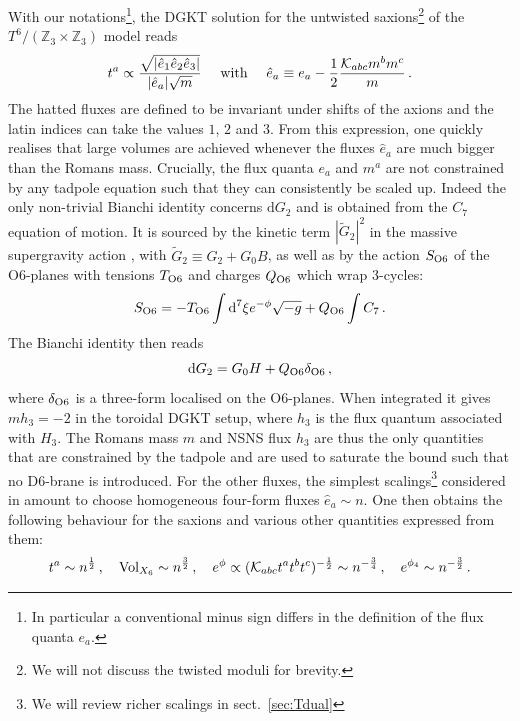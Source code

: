 \documentclass[11pt, a4paper]{article}
\newcommand{\K}{{\cal K}}
\newcommand{\dd}{\text{d}}
\newcommand{\Z}{\mathbb{Z}}
\newcommand{\half}{\frac{1}{2}}
\begin{document}
With our notations\footnote{In particular a conventional minus sign differs in the definition of the flux quanta $e_a$.}, the DGKT solution for the untwisted saxions\footnote{We will not discuss the twisted moduli for brevity.} of the $T^6/(\Z_3\times\Z_3)$ model reads
\begin{equation}
\label{eq:DGKT}
t^a\propto\frac{\sqrt{|\hat e_1\hat e_2\hat e_3|}}{|\hat e_a|\sqrt{m}}\quad\text{ with }\quad \hat e_a\equiv e_a-\half\frac{\K_{abc}m^bm^c}{m}\, .
\end{equation}
%
The hatted fluxes are defined to be invariant under shifts of the axions and the latin indices can take the values $1$, $2$ and $3$. From this expression, one quickly realises that large volumes are achieved whenever the fluxes $\hat e_a$ are much bigger than the Romans mass. Crucially, the flux quanta $e_a$ and $m^a$ are not constrained by any tadpole equation such that they can consistently be scaled up. Indeed the only non-trivial Bianchi identity concerns $\dd G_2$ and is obtained from the $C_7$ equation of motion. It is sourced by the kinetic term $|\tilde G_2|^2$ in the massive supergravity action \cite{Romans:1985tz}, with $\tilde G_2\equiv G_2+G_0B$, as well as by the action $S_{\rm O6}$ of the O6-planes with tensions $T_{\rm O6}$ and charges $Q_{\rm O6}$ which wrap 3-cycles:
\begin{equation}
S_{\rm O6}=-T_{\rm O6}\int \dd^7\xi e^{-\phi}\sqrt{-g}+Q_{\rm O6}\int C_7\, .
\end{equation}
%
The Bianchi identity then reads 
\begin{equation}
\dd G_2=G_0H+Q_{\rm O6}\delta_{{\rm O}6}\, ,
\end{equation}
%
where $\delta_{{\rm O}6}$ is a three-form localised on the O6-planes. When integrated it gives $mh_3=-2$ in the toroidal DGKT setup, where $h_3$ is the flux quantum associated with $H_3$. The Romans mass $m$ and NSNS flux $h_3$ are thus the only quantities that are constrained by the tadpole and are used to saturate the bound such that no D6-brane is introduced. For the other fluxes, the simplest scalings\footnote{We will review richer scalings in sect.~\ref{sec:Tdual}} considered in \cite{DeWolfe:2005uu} amount to choose homogeneous four-form fluxes $\hat e_a\sim n$. One then obtains the following behaviour for the saxions and various other quantities expressed from them:
\begin{equation}
\label{eq:DGKT2}
t^a\sim n^\half\, ,\quad \text{Vol}_{X_6}\sim n^\frac{3}{2}\, ,\quad e^\phi\propto (\K_{abc}t^at^bt^c)^{-\frac{1}{2}}\sim n^{-\frac{3}{4}}\, ,\quad e^{\phi_4}\sim n^{-\frac{3}{2}}\, .
\end{equation}
\end{document}
